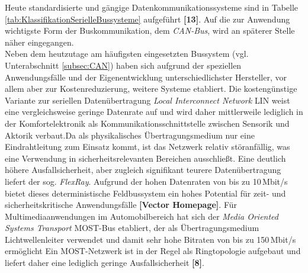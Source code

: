 Heute standardisierte und gängige Datenkommunikationssysteme sind in Tabelle \ref{tab:KlassifikationSerielleBussysteme} aufgeführt \textbf{[13]}. Auf die zur Anwendung wichtigste Form der Buskommunikation, dem \emph{\acs{CAN}-Bus}, wird an späterer Stelle näher eingegangen. \\
Neben dem heutzutage am häufigsten eingesetzten Bussystem (vgl. Unterabschnitt \ref{subsec:CAN}) haben sich aufgrund der speziellen Anwendungsfälle und der Eigenentwicklung unterschiedlichster Hersteller, vor allem aber zur Kostenreduzierung, weitere Systeme etabliert. Die kostengünstige Variante zur seriellen Datenübertragung \emph{Local Interconnect Network} \acs{LIN} weist eine vergleichsweise geringe Datenrate auf und wird daher mittlerweile lediglich in der Komfortelektronik als Kommunikationsschnittstelle zwischen Sensorik und Aktorik verbaut.Da als physikalisches Übertragungsmedium nur eine Eindrahtleitung zum Einsatz kommt, ist das Netzwerk relativ störanfällig, was eine Verwendung in sicherheitsrelevanten Bereichen ausschließt. Eine deutlich höhere Ausfallsicherheit, aber zugleich signifikant teurere Datenübertragung liefert der sog. \emph{FlexRay}. Aufgrund der hohen Datenraten von bis zu 10\,Mbit/s bietet dieses deterministische Feldbussystem ein hohes Potential für zeit- und sicherheitskritische Anwendungsfälle \textbf{[Vector Homepage]}. Für Multimediaanwendungen im Automobilbereich hat sich der \emph{Media Oriented Systems Transport} \acs{MOST}-Bus etabliert, der als Übertragungsmedium Lichtwellenleiter verwendet und damit sehr hohe Bitraten von bis zu 150\,Mbit/s ermöglicht Ein MOST-Netzwerk ist in der Regel als Ringtopologie aufgebaut und liefert daher eine lediglich geringe Ausfallsicherheit \textbf{[8]}.\\


